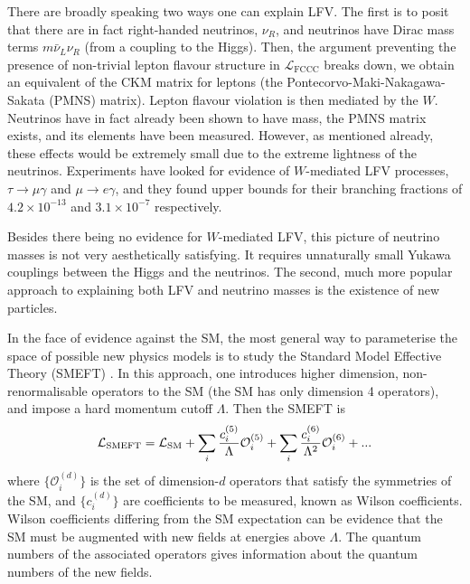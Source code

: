 There are broadly speaking two ways one can explain LFV. The first is to posit that there are in fact right-handed neutrinos, $\nu_R$, and neutrinos have Dirac mass terms $m\bar{\nu}_L\nu_R$ (from a coupling to the Higgs). Then, the argument preventing the presence of non-trivial lepton flavour structure in $\mathcal{L}_{\text{FCCC}}$ breaks down, we obtain an equivalent of the CKM matrix for leptons (the Pontecorvo-Maki-Nakagawa-Sakata (PMNS) matrix). Lepton flavour violation is then mediated by the $W$. Neutrinos have in fact already been shown to have mass, the PMNS matrix exists, and its elements have been measured. However, as mentioned already, these effects would be extremely small due to the extreme lightness of the neutrinos. Experiments have looked for evidence of $W$-mediated LFV processes, $\tau\to \mu\gamma$ and $\mu\to e\gamma$, and they found upper bounds for their branching fractions of $4.2\times 10^{-13}$ \cite{Abe:2003sx} and $3.1\times 10^{-7}$ \cite{TheMEG:2016wtm} respectively.

Besides there being no evidence for $W$-mediated LFV, this picture of neutrino masses is not very aesthetically satisfying. It requires unnaturally small Yukawa couplings between the Higgs and the neutrinos. The second,  much more popular approach to explaining both LFV and neutrino masses is the existence of new particles.

In the face of evidence against the SM, the most general way to parameterise the space of possible new physics models is to study the Standard Model Effective Theory (SMEFT) \cite{Brivio:2017vri}. In this approach, one introduces higher dimension, non-renormalisable operators to the SM (the SM has only dimension 4 operators), and impose a hard momentum cutoff $\Lambda$. Then the SMEFT is
\begin{align}
  \mathcal{L}_{\text{SMEFT}} = \mathcal{L}_{\text{SM}} + \sum_i {c^{(5)}_i\over\Lambda} \mathcal{O}^{(5)}_i + \sum_i {c^{(6)}_i\over\Lambda^2} \mathcal{O}^{(6)}_i + ...
\end{align}
where $\{\mathcal{O}_i^{(d)}\}$ is the set of dimension-$d$ operators that satisfy the symmetries of the SM, and $\{c_i^{(d)}\}$ are coefficients to be measured, known as Wilson coefficients. Wilson coefficients differing from the SM expectation can be evidence that the SM must be augmented with new fields at energies above $\Lambda$. The quantum numbers of the associated operators gives information about the quantum numbers of the new fields.

